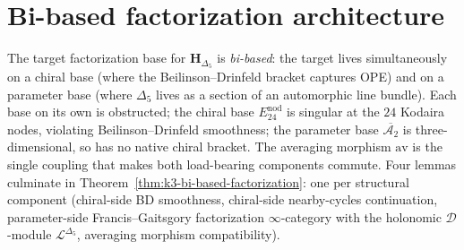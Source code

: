 \section{Bi-based factorization architecture}
\label{sec:k3-bi-based-factorization}

The target factorization base for $\mathbf{H}_{\Delta_5}$ is
\emph{bi-based}: the target lives simultaneously on a chiral base (where
the Beilinson--Drinfeld bracket captures OPE) and on a parameter base
(where $\Delta_5$ lives as a section of an automorphic line bundle).  Each
base on its own is obstructed; the chiral base $E^{\mathrm{nod}}_{24}$ is
singular at the $24$ Kodaira nodes, violating Beilinson--Drinfeld
smoothness; the parameter base $\overline{\mathcal{A}_2}$ is
three-dimensional, so has no native chiral bracket.  The averaging
morphism $\mathrm{av}$ is the single coupling that makes both load-bearing
components commute.  Four lemmas culminate in
Theorem~\ref{thm:k3-bi-based-factorization}: one per structural component
(chiral-side BD smoothness, chiral-side nearby-cycles continuation,
parameter-side Francis--Gaitsgory factorization $\infty$-category with the
holonomic $\mathcal{D}$-module $\mathcal{L}^{\Delta_5}$, averaging
morphism compatibility).

